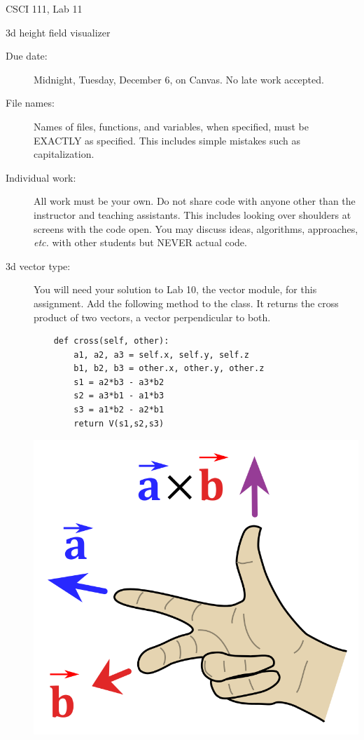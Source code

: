 \documentclass[12pt]{article}
\begin{document}
\sloppy
\centerline{\Large CSCI 111, Lab 11}
\centerline{\large 3d height field visualizer}


\begin{description}
\item[Due date:] Midnight, Tuesday, December 6, on Canvas.
No late work accepted.  

\item[File names:]  Names of files, functions, and variables, 
when specified,
must be EXACTLY as specified.  This includes simple mistakes such
as capitalization.

\item[Individual work:]  All work must be your own.  Do not share
code with anyone other than the instructor and teaching assistants.
This includes looking over shoulders at screens with the code open.
You may discuss ideas, algorithms, approaches, {\em etc.} with
other students but NEVER actual code.

\item[3d vector type:]  You will need your solution to Lab 10,
the vector module, for this assignment.  Add the following method
to the class.  It returns the cross product of two vectors,
a vector perpendicular to both.

\begin{lstlisting}
    def cross(self, other):
        a1, a2, a3 = self.x, self.y, self.z
        b1, b2, b3 = other.x, other.y, other.z
        s1 = a2*b3 - a3*b2
        s2 = a3*b1 - a1*b3
        s3 = a1*b2 - a2*b1
        return V(s1,s2,s3)
\end{lstlisting}
\includegraphics[scale=0.2]{crossproduct}


\end{description}
\end{document}
